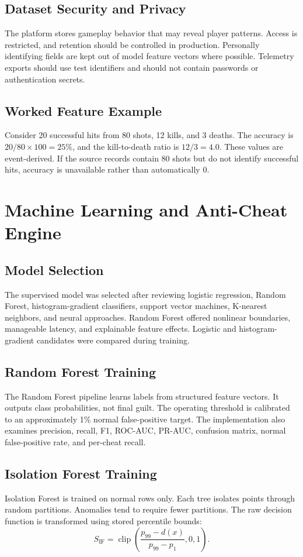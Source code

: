 \documentclass[12pt,a4paper,oneside]{report}
\begin{document}
\section{Dataset Security and Privacy}
The platform stores gameplay behavior that may reveal player patterns. Access is restricted, and retention should be controlled in production. Personally identifying fields are kept out of model feature vectors where possible. Telemetry exports should use test identifiers and should not contain passwords or authentication secrets.

\section{Worked Feature Example}
Consider 20 successful hits from 80 shots, 12 kills, and 3 deaths. The accuracy is $20/80\times100=25\%$, and the kill-to-death ratio is $12/3=4.0$. These values are event-derived. If the source records contain 80 shots but do not identify successful hits, accuracy is unavailable rather than automatically 0.

\chapter{Machine Learning and Anti-Cheat Engine}
\section{Model Selection}
The supervised model was selected after reviewing logistic regression, Random Forest, histogram-gradient classifiers, support vector machines, K-nearest neighbors, and neural approaches. Random Forest offered nonlinear boundaries, manageable latency, and explainable feature effects. Logistic and histogram-gradient candidates were compared during training.

\section{Random Forest Training}
The Random Forest pipeline learns labels from structured feature vectors. It outputs class probabilities, not final guilt. The operating threshold is calibrated to an approximately 1\% normal false-positive target. The implementation also examines precision, recall, F1, ROC-AUC, PR-AUC, confusion matrix, normal false-positive rate, and per-cheat recall.

\section{Isolation Forest Training}
Isolation Forest is trained on normal rows only. Each tree isolates points through random partitions. Anomalies tend to require fewer partitions. The raw decision function is transformed using stored percentile bounds:
\[
S_{\mathrm{IF}}=\operatorname{clip}\left(\frac{p_{99}-d(x)}{p_{99}-p_1},0,1\right).
\]
\end{document}
